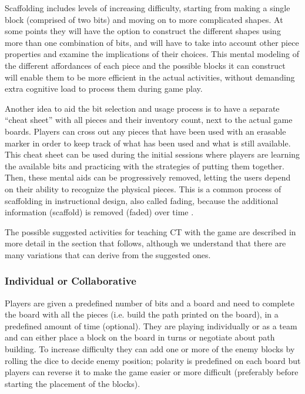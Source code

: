 \documentclass{acm_proc_article-sp}
\begin{document}
Scaffolding includes levels of increasing difficulty, starting from making a single block (comprised of two bits) and moving on to more complicated shapes.
At some points they will have the option to construct the different shapes using more than one combination of bits, and will have to take into account other piece properties and examine the implications of their choices.
This mental modeling of the different affordances of each piece and the possible blocks it can construct will enable them to be more efficient in the actual activities, without demanding extra cognitive load to process them during game play. 

Another idea to aid the bit selection and usage process is to have a separate ``cheat sheet'' with all pieces and their inventory count, next to the actual game boards.
Players can cross out any pieces that have been used with an erasable marker in order to keep track of what has been used and what is still available.
This cheat sheet can be used during the initial sessions where players are learning the available bits and practicing with the strategies of putting them together.
Then, these mental aids can be progressively removed, letting the users depend on their ability to recognize the physical pieces.
This is a common process of scaffolding in instructional design, also called fading, because the additional information (scaffold) is removed (faded) over time \cite{driscoll2005psychology}.

The possible suggested activities for teaching CT with the game are described in more detail in the section that follows, although we understand that there are many variations that can derive from the suggested ones.

\subsubsection{Individual or Collaborative}
Players are given a predefined number of bits and a board and need to complete the board with all the pieces (i.e. build the path printed on the board), in a predefined amount of time (optional).
They are playing individually or as a team and can either place a block on the board in turns or negotiate about path building.
To increase difficulty they can add one or more of the enemy blocks by rolling the dice to decide enemy position; polarity is predefined on each board but players can reverse it to make the game easier or more difficult (preferably before starting the placement of the blocks).
\end{document}

